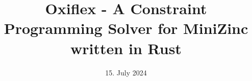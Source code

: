 \documentclass[a4paper, 10pt, oneside]{memoir}
\title				{Oxiflex - A Constraint Programming Solver for MiniZinc written in Rust}
\date				{15. July 2024}
\begin{document}

\thesisfront
\maketitle
\pagestyle{thesis}
% 

\thesistoc
\thesismain






\thesisappendix
\thesisbib
\begin{appendices}
	
\end{appendices}
\thesisback
{}
{}
{}
\end{document}
